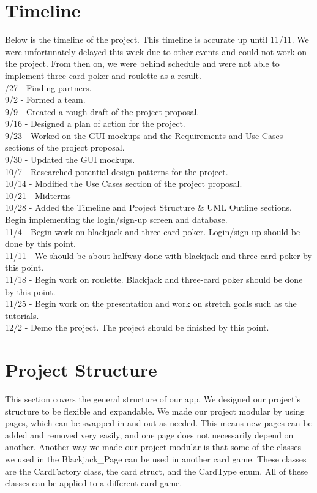 \documentclass[10pt,conference,onecolumn,compsoc]{IEEEtran}
\begin{document}
\section{Timeline}
\noindent
Below is the timeline of the project. This timeline is accurate up until 11/11. We were unfortunately delayed this week due to other events and could not work on the project. From then on, we were behind schedule and were not able to implement three-card poker and roulette as a result.\\
/27 - Finding partners.\\
9/2 - Formed a team.\\
9/9 - Created a rough draft of the project proposal.\\
9/16 - Designed a plan of action for the project.\\
9/23 - Worked on the GUI mockups and the Requirements and Use Cases sections of the project proposal.\\
9/30 - Updated the GUI mockups.\\
10/7 - Researched potential design patterns for the project.\\
10/14 - Modified the Use Cases section of the project proposal.\\
10/21 - Midterms\\
10/28 - Added the Timeline and Project Structure \& UML Outline sections. Begin implementing the login/sign-up screen and database.\\
11/4 - Begin work on blackjack and three-card poker. Login/sign-up should be done by this point.\\
11/11 - We should be about halfway done with blackjack and three-card poker by this point.\\
11/18 - Begin work on roulette. Blackjack and three-card poker should be done by this point.\\
11/25 - Begin work on the presentation and work on stretch goals such as the tutorials.\\
12/2 - Demo the project. The project should be finished by this point.\\

\section{Project Structure}
\noindent
This section covers the general structure of our app. We designed our project's structure to be flexible and expandable. We made our project modular by using pages, which can be swapped in and out as needed. This means new pages can be added and removed very easily, and one page does not necessarily depend on another. Another way we made our project modular is that some of the classes we used in the Blackjack\_Page can be used in another card game. These classes are the CardFactory class, the card struct, and the CardType enum. All of these classes can be applied to a different card game.
\end{document}
